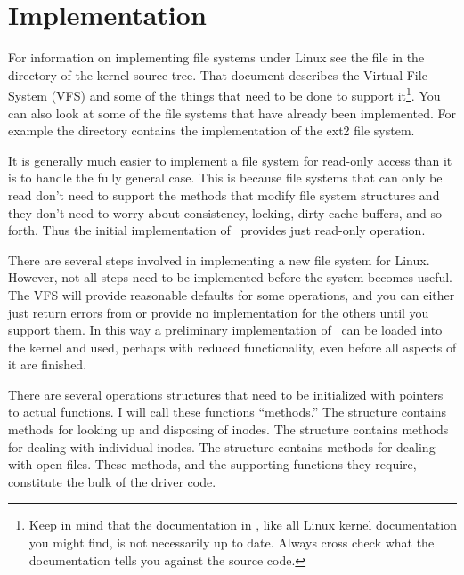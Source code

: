 %
%
%
%

\section{Implementation}
\label{sec:implementation}

For information on implementing file systems under Linux see the file  in the
 directory of the kernel source tree. That document
describes the Virtual File System (VFS) and some of the things that need to be done to support
it\footnote{Keep in mind that the documentation in , like all Linux
  kernel documentation you might find, is not necessarily up to date. Always cross check what
  the documentation tells you against the source code.}. You can also look at some of the file
systems that have already been implemented. For example the directory 
contains the implementation of the ext2 file system.

It is generally much easier to implement a file system for read-only access than it is to handle
the fully general case. This is because file systems that can only be read don't need to support
the methods that modify file system structures and they don't need to worry about consistency,
locking, dirty cache buffers, and so forth. Thus the initial implementation of \GenericFS\
provides just read-only operation.

There are several steps involved in implementing a new file system for Linux. However, not all
steps need to be implemented before the system becomes useful. The VFS will provide reasonable
defaults for some operations, and you can either just return errors from or provide no
implementation for the others until you support them. In this way a preliminary implementation
of \GenericFS\ can be loaded into the kernel and used, perhaps with reduced functionality, even
before all aspects of it are finished.

There are several operations structures that need to be initialized with pointers to actual
functions. I will call these functions ``methods.'' The \code{super_block} structure contains
methods for looking up and disposing of inodes. The \code{inode_operations} structure contains
methods for dealing with individual inodes. The \code{file_operations} structure contains
methods for dealing with open files. These methods, and the supporting functions they require,
constitute the bulk of the driver code.

